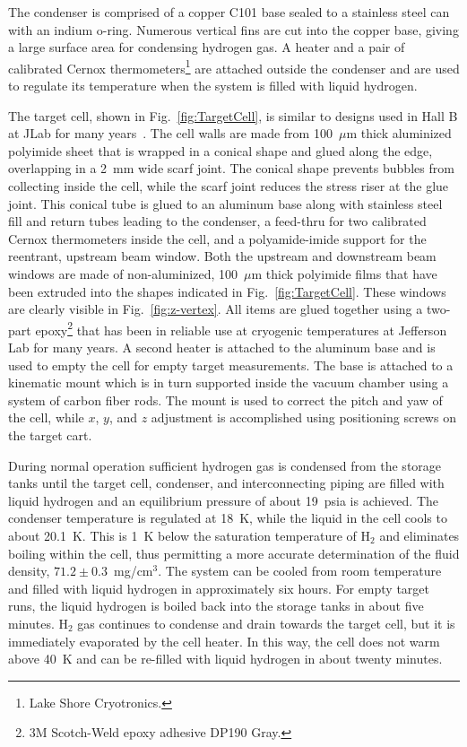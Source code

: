 The condenser is comprised of a copper C101 base
sealed to a stainless steel can with an indium o-ring.  Numerous vertical 
fins are cut into the copper base, giving a large surface area for condensing hydrogen gas.
A heater and a pair of calibrated Cernox thermometers\footnote{Lake Shore Cryotronics.}
are attached outside the condenser and are used to regulate its temperature when the
system is filled with liquid hydrogen.

The target cell, shown in Fig.~\ref{fig:TargetCell}, is similar to
designs used in Hall B at JLab for many years~\cite{HAKOBYAN2008218}.  
The cell walls are made from 100~$\mu$m thick aluminized
polyimide sheet that is wrapped in a conical shape and glued along the edge,
overlapping in a 2~mm wide scarf joint.  
The conical shape prevents bubbles from collecting inside the cell, while the
scarf joint reduces the stress riser at the glue joint.  This conical
tube is glued to an aluminum base 
along with stainless steel fill and return tubes leading to the condenser, a feed-thru for two calibrated Cernox thermometers inside the cell, and a
polyamide-imide support for the reentrant, upstream beam window.  
Both the upstream and downstream beam
windows are made of non-aluminized,
100~$\mu$m thick polyimide films that have been extruded into the
shapes indicated in Fig.~\ref{fig:TargetCell}. These windows are clearly
visible in Fig.~\ref{fig:z-vertex}. All items are glued together using
a two-part epoxy\footnote{3M Scotch-Weld epoxy adhesive DP190 Gray.}
that has been in reliable use at cryogenic temperatures at
Jefferson Lab for many years. 
A second  heater is attached to the aluminum base and
is used to empty the cell for empty target measurements.
The base is attached to a kinematic mount which is in turn
supported inside the vacuum chamber using a system of carbon fiber rods.    
The mount is used to correct the pitch and yaw
of the cell, while $x$, $y$, and $z$ adjustment 
is accomplished using positioning screws on the target cart. 


During normal operation sufficient hydrogen gas is condensed from the storage tanks
until the target cell, condenser, and interconnecting piping are filled with liquid hydrogen
and an equilibrium pressure of about 19~psia is achieved.  
The condenser temperature is regulated at 18~K, while the
liquid in the cell cools to about 20.1~K.  This is 1~K below the saturation
temperature of H$_2$ and eliminates boiling within the cell, thus permitting a more
accurate determination of the fluid density, 
$71.2 \pm 0.3$~mg/cm$^3$.  
The system can be cooled from room temperature and filled with liquid hydrogen in
approximately six hours.  For empty target runs, the liquid hydrogen is boiled back into the storage tanks in about five minutes.  H$_2$ gas continues to condense and drain towards the target cell, but it is immediately 
evaporated by the cell heater.  In this way, the cell does not warm above 40~K and
can be re-filled with liquid hydrogen in about twenty minutes.

